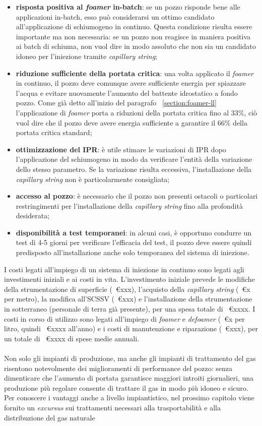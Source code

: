 \begin{itemize}
    \item \textbf{risposta positiva al \textit{foamer} in-batch}: se un pozzo risponde bene alle applicazioni in-batch, esso può considerarsi un ottimo candidato all'applicazione di schiumogeno in continuo. Questa condizione risulta essere importante ma non necessaria: se un pozzo non reagisce in maniera positiva ai batch di schiuma, non vuol dire in modo assoluto che non sia un candidato idoneo per l'iniezione tramite \textit{capillary string};
    \item \textbf{riduzione sufficiente della portata critica}:  una volta applicato il \textit{foamer} in continuo, il pozzo deve comunque avere sufficiente energia per spiazzare l'acqua e evitare nuovamente l'aumento del battente idrostatico a fondo pozzo. Come già detto all'inizio del paragrafo ~\ref{section:foamer-ll} l'applicazione di \textit{foamer} porta a riduzioni della portata critica fino al 33\%, ciò vuol dire che il pozzo deve avere energia sufficiente a garantire il 66\% della portata critica standard;
    \item \textbf{ottimizzazione del IPR}: è utile stimare le variazioni di IPR dopo l'applicazione del schiumogeno in modo da verificare l'entità della variazione dello stesso parametro. Se la variazione risulta eccessiva, l'installazione della \textit{capillary string} non è particolarmente consigliata;
    \item \textbf{accesso al pozzo}: è necessario che il pozzo non presenti ostacoli o particolari restringimenti per l'installazione della \textit{capillary string} fino alla profondità desiderata;
    \item \textbf{disponibilità a test temporanei}: in alcuni casi, è opportuno condurre un test di 4-5 giorni per verificare l'efficacia del test, il pozzo deve essere quindi predisposto all'installazione anche solo temporanea del sistema di iniezione.
\end{itemize}
I costi legati all'impiego di un sistema di iniezione in continuo sono legati agli investimenti iniziali e ai costi in vita. L'investimento iniziale prevede le modifiche della strumentazione di superficie (~€xxx), l'acquisto della \textit{capillary string} (~€x per metro), la modifica all'SCSSV (~€xxx) e l'installazione della strumentazione in sotterraneo (personale di terra già presente), per una spesa totale di ~€xxxx. I costi in corso di utilizzo sono legati all'impiego di \textit{foamer} e \textit{defoamer} (~€x per litro, quindi ~€xxxx all'anno) e i costi di manutenzione e riparazione (~€xxx), per un totale di ~€xxxx di spese medie annuali.  \\ \\
Non solo gli impianti di produzione, ma anche gli impianti di trattamento del gas risentono notevolmente dei miglioramenti di performance del pozzo: senza dimenticare che l'aumento di portata garantisce maggiori introiti giornalieri, una produzione più regolare consente di trattare il gas in modo più idoneo e sicuro. Per conoscere i vantaggi anche a livello impiantistico, nel prossimo capitolo viene fornito un \textit{excursus} sui trattamenti necessari alla trasportabilità e alla distribuzione del gas naturale